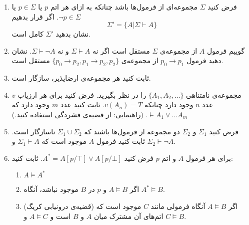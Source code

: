 \documentclass[12pt, 14paper]{article}
\begin{document}
\begin{enumerate}
\item
فرض کنید $\Sigma$ مجموعه‌ای از فرمول‌ها باشد چنانکه به ازای هر اتم $p$ یا
$p\in\Sigma$
یا
$\neg p\in\Sigma$.
اگر قرار بدهیم
$$
\Sigma' = \{A|\Sigma\vdash A\}
$$
نشان بدهید $\Sigma'$ کامل است.
\item
گوییم فرمول $A$ از مجموعه‌ی $\Sigma$ مستقل است اگر نه $\Sigma\vdash A$ و نه $\Sigma\vdash\neg A$. نشان دهید فرمول $p_0\to p_1$ از مجموعه‌ی
$\{p_0\to p_2, p_1\to p_2, p_2\}$
مستقل است.

\item
ثابت کنید هر مجموعه‌ی ارضاپذیر، سازگار است.

\item
مجموعه‌ی نامتناهی
$\{A_1,A_2,\ldots\}$
را در نظر بگیرید. فرض کنید برای هر ارزیاب $v$ عدد $n$ وجود دارد چنانکه $v(A_n)=T$. ثابت کنید عدد $m$ وجود دارد که
$\models A_1\vee\ldots A_m$.
(راهنمایی: از قضیه‌ی فشردگی استفاده کنید.)
\item
فرض کنید
$\Sigma_1$
و
$\Sigma_2$
دو مجموعه از فرمول‌ها باشند که
$\Sigma_1\cup \Sigma_2$
ناسازگار است. ثابت کنید فرمول $A$ موجود است که $\Sigma_1\vdash A$ و $\Sigma_2\vdash \neg A$.

\item
برای هر فرمول $A$ و اتم $p$ فرض کنید
$A^*=A[p/\top]\vee A[p/\bot]$.
ثابت کنید:
\begin{enumerate}
\item
$A\models A^*$
\item
اگر
$A\models B$
و $p$ در $B$ موجود نباشد، آنگاه
$A^*\models B$.
\item
(قضیه‌ی درونیابی کریگ) اگر
$A\models B$
آنگاه فرمولی مانند $C$ موجود است که اتم‌های آن مشترک میان $A$ و $B$ است و $A\models C$ و $C\models B$.
\end{enumerate}

\end{enumerate}
\end{document}
